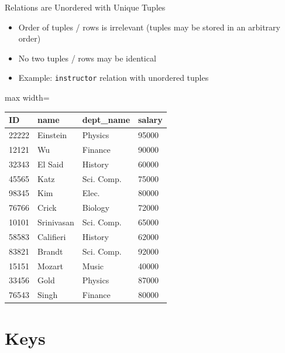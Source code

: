 \documentclass[aspectratio=169, xcolor=dvipsnames]{beamer}
\begin{document}
\begin{frame}{Relations are Unordered with Unique Tuples}
    \begin{itemize}
        \item Order of tuples / rows is irrelevant (tuples may be stored in an arbitrary order)
        \item No two tuples / rows may be identical
        \item Example: \texttt{instructor} relation with unordered tuples
    \end{itemize}
    \vspace{0.5em}
    \begin{center}
        \begin{adjustbox}{max width=\textwidth}
        \begin{tabular}{|l|l|l|l|}
        \hline
        \textbf{ID} & \textbf{name} & \textbf{dept\_name} & \textbf{salary} \\ \hline
        22222 & Einstein   & Physics     & 95000 \\ \hline
        12121 & Wu         & Finance     & 90000 \\ \hline
        32343 & El Said    & History     & 60000 \\ \hline
        45565 & Katz       & Sci. Comp.  & 75000 \\ \hline
        98345 & Kim        & Elec.       & 80000 \\ \hline
        76766 & Crick      & Biology     & 72000 \\ \hline
        10101 & Srinivasan & Sci. Comp.  & 65000 \\ \hline
        58583 & Califieri  & History     & 62000 \\ \hline
        83821 & Brandt     & Sci. Comp.  & 92000 \\ \hline
        15151 & Mozart     & Music       & 40000 \\ \hline
        33456 & Gold       & Physics     & 87000 \\ \hline
        76543 & Singh      & Finance     & 80000 \\ \hline
        \end{tabular}
        \end{adjustbox}
    \end{center}
\end{frame}

\section{Keys}
\end{document}
